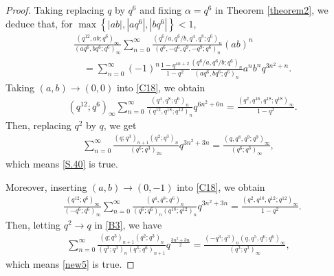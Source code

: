\documentclass[reqno,12pt]{amsart}
\theoremstyle{remark}
\numberwithin{equation}{section}
\begin{document}
\begin{proof}
Taking replacing  $q$ by $q^6$ and  fixing $\alpha=q^6$ in Theorem \ref{theorem2}, we deduce that,
for $\max\left\{|ab|, |aq^6|, |bq^6|\right\}<1$, 
\begin{align}
&\frac{\left(q^{12},ab;q^6\right)_{\infty}}{\left(aq^6,bq^6;q^6\right)_{\infty}}
\sum_{n=0}^{\infty}
\frac{\left(q^6/a,q^6/b,q^4,q^8;q^6\right)_n}
{\left(q^6,-q^6,q^9,-q^9;q^6\right)_n}\left(ab\right)^n\nonumber\\
&\quad=\sum_{n=0}^{\infty}\left(-1\right)^n\frac{1-q^{4n+2}}{1-q^2}
\frac{\left(q^6/a,q^6/b;q^6\right)_n}{\left(aq^6,bq^6;q^6\right)_n}a^nb^nq^{3n^2+n}.\label{C18}
\end{align}
Taking $\left(a,b\right)\to\left(0,0\right)$ into \eqref{C18}, we obtain
\begin{align}
&\left(q^{12};q^6\right)_{\infty}
\sum_{n=0}^{\infty}
\frac{\left(q^4,q^8;q^6\right)_n}{\left(q^{12},q^{18};q^{12}\right)_n}
q^{6n^2+6n}
=\frac{\left(q^2,q^{16},q^{18};q^{18}\right)_{\infty}}{1-q^2}.\label{B2}
\end{align}
Then, replacing $q^2$ by $q$, we get
\begin{align*}
\sum_{n=0}^{\infty}\frac{\left(q;q^3\right)_{n+1}\left(q^2;q^3\right)_n}
{\left(q^6;q^3\right)_{2n}}q^{3n^2+3n}
=\frac{\left(q,q^8,q^9;q^9\right)_{\infty}}{
\left(q^6;q^3\right)_{\infty}},
\end{align*}
which means \eqref{S.40} is true.

Moreover, inserting $\left(a,b\right)\to\left(0,-1\right)$ into \eqref{C18}, we obtain
\begin{align}
&\frac{\left(q^{12};q^6\right)_{\infty}}{\left(-q^6;q^6\right)_{\infty}}
\sum_{n=0}^{\infty}
\frac{\left(q^4,q^8;q^6\right)_n}
{\left(q^6;q^6\right)_n\left(q^{18};q^{12}\right)_n}q^{3n^2+3n}
=\frac{\left(q^2,q^{10},q^{12};q^{12}\right)_{\infty}}{1-q^2}.\label{B3}
\end{align}
Then, letting $q^2\to q$ in \eqref{B3}, we have
\begin{align*}
\sum_{n=0}^{\infty}\frac{\left(q;q^3\right)_{n+1}\left(q^2;q^3\right)_n}
{\left(q^3;q^3\right)_n\left(q^3;q^6\right)_{n+1}}q^{\frac{3n^2+3n}{2}}
=
\frac{\left(-q^3;q^3\right)_n\left(q,q^{5},q^{6};q^{6}\right)_{\infty}}
{\left(q^3;q^3\right)_{\infty}},
\end{align*}
which means \eqref{new5} is true.
\end{proof}
\end{document}
